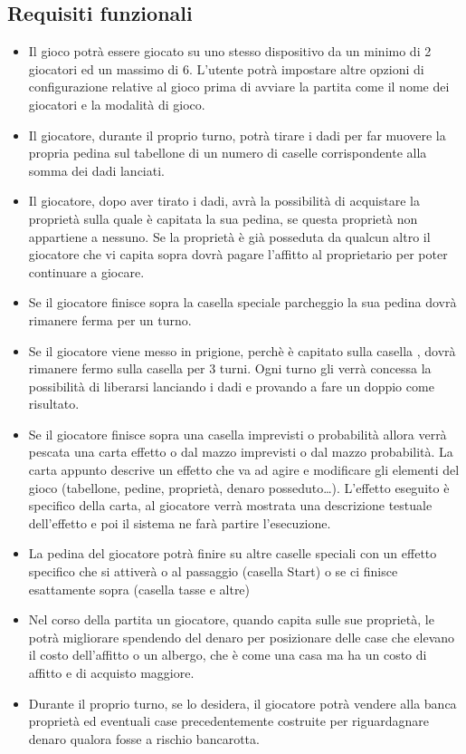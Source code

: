 \subsection{Requisiti funzionali}
\begin{itemize}
    \item Il gioco potrà essere giocato su uno stesso dispositivo da un minimo di 2 giocatori ed un massimo di 6. L'utente
    potrà impostare altre opzioni di configurazione relative al gioco prima di avviare la partita come il nome dei giocatori e 
    la modalità di gioco.
	\item Il giocatore, durante il proprio turno, potrà tirare i dadi per far muovere la propria pedina sul tabellone di un numero di 
    caselle corrispondente alla somma dei dadi lanciati.
	\item Il giocatore, dopo aver tirato i dadi, avrà la possibilità di acquistare la proprietà sulla quale 
    è capitata la sua pedina, se questa proprietà non appartiene a nessuno. 
    Se la proprietà è già posseduta da qualcun altro il giocatore che vi capita sopra dovrà pagare l’affitto al proprietario 
    per poter continuare a giocare.
    \item Se il giocatore finisce sopra la casella speciale parcheggio la sua pedina
    dovrà rimanere ferma per un turno.
    \item Se il giocatore viene messo in prigione, perchè è capitato sulla casella ,
    dovrà rimanere fermo sulla casella  per 3 turni. Ogni turno gli verrà concessa la possibilità di liberarsi lanciando i dadi
    e provando a fare un doppio come risultato.
    \item Se il giocatore finisce sopra una casella imprevisti o probabilità allora verrà pescata una carta effetto
    o dal mazzo imprevisti o dal mazzo probabilità. La carta appunto descrive un effetto che va ad agire e modificare gli
    elementi del gioco (tabellone, pedine, proprietà, denaro posseduto\dots). L'effetto eseguito è specifico della carta,
    al giocatore verrà mostrata una descrizione testuale dell'effetto e poi il sistema ne farà partire l'esecuzione.
    \item La pedina del giocatore potrà finire su altre caselle speciali con un effetto specifico che si attiverà o al 
    passaggio (casella Start) o se ci finisce esattamente sopra (casella tasse e altre)
    \item Nel corso della partita un giocatore, quando capita sulle sue proprietà, le potrà migliorare spendendo
    del denaro per posizionare delle case che elevano il costo dell’affitto o un albergo, che è come una casa 
    ma ha un costo di affitto e di acquisto maggiore.
    \item Durante il proprio turno, se lo desidera, il giocatore potrà vendere alla banca 
    proprietà ed eventuali case precedentemente costruite per riguardagnare denaro qualora fosse a rischio
    bancarotta.
\end{itemize}


